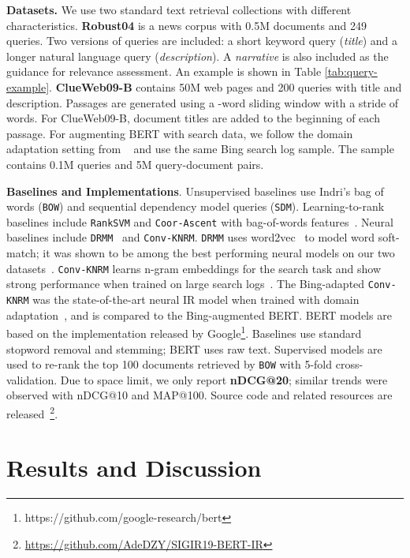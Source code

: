 \documentclass[sigconf]{acmart}
\begin{document}
\textbf{Datasets.} We use two standard text retrieval collections with different characteristics. \textbf{Robust04} is a news corpus with 0.5M documents and 249 queries. Two versions of queries are included: a short keyword query (\textit{title}) and a longer natural language query (\textit{description}). A \textit{narrative} is also included as the guidance for relevance assessment. An example is shown in Table \ref{tab:query-example}. \textbf{ClueWeb09-B} contains 50M web pages and 200 queries with title and description. Passages are generated using a -word sliding window with a stride of  words. For ClueWeb09-B, document titles are added to the beginning of each passage. For augmenting BERT with search data, we follow the domain adaptation setting from ~\citet{dai2018convolutional} and use the same Bing search log sample. The sample contains 0.1M queries and 5M query-document pairs.

\textbf{Baselines and Implementations}. Unsupervised baselines use Indri's bag of words (\texttt{BOW}) and sequential dependency model queries (\texttt{SDM}). 
Learning-to-rank baselines include \texttt{RankSVM} and \texttt{Coor-Ascent} with bag-of-words features~\cite{dai2018convolutional}. Neural baselines include \texttt{DRMM}~\cite{DRMM} and \texttt{Conv-KNRM}. \texttt{DRMM} uses word2vec~\cite{word2vec} to model word soft-match; it was shown to be among the best performing neural models on our two datasets~\cite{DRMM}. \texttt{Conv-KNRM} learns n-gram embeddings for the search task and show strong performance when 
trained on large search logs~\cite{dai2018convolutional}.  The Bing-adapted \texttt{Conv-KNRM} was the state-of-the-art neural IR model when trained with domain adaptation~\cite{dai2018convolutional}, and is compared to the Bing-augmented BERT. BERT models are based on the implementation released by Google\footnote{https://github.com/google-research/bert}. Baselines use standard stopword removal and stemming; BERT uses raw text. Supervised models are used to re-rank the top 100 documents retrieved by \texttt{BOW} with 5-fold cross-validation. Due to space limit, we only report \textbf{nDCG@20}; similar trends were observed with nDCG@10 and MAP@100. Source code and related resources are released~\footnote{\url{https://github.com/AdeDZY/SIGIR19-BERT-IR}}.




  \section{Results and Discussion}
\end{document}
